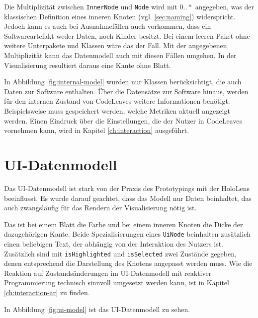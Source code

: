 Die Multiplizität zwischen \texttt{InnerNode} und \texttt{Node} wird mit $0..*$ angegeben, was der klassischen Definition eines inneren Knoten (vgl. \ref{sec:naming}) widerspricht. Jedoch kann es auch bei Ausnahmefällen auch vorkommen, dass ein Softwareartefakt weder Daten, noch Kinder besitzt. Bei einem leeren Paket ohne weitere Unterpakete und Klassen wäre das der Fall. Mit der angegebenen Multiplizität kann das Datenmodell auch mit diesen Fällen umgehen. In der Visualisierung resultiert daraus eine Kante ohne Blatt.

In Abbildung \ref{fig:internal-model} wurden nur Klassen berücksichtigt, die auch Daten zur Software enthalten. Über die Datensätze zur Software hinaus, werden für den internen Zustand von CodeLeaves weitere Informationen benötigt. Beispielsweise muss gespeichert werden, welche Metriken aktuell angezeigt werden. Einen Eindruck über die Einstellungen, die der Nutzer in CodeLeaves vornehmen kann, wird in Kapitel \ref{ch:interaction} ausgeführt.

\section{UI-Datenmodell}
\label{sec:hierarchical-model}

Das UI-Datenmodell ist stark von der Praxis des Prototypings mit der HoloLens beeinflusst. Es wurde darauf geachtet, dass das Modell nur Daten beinhaltet, das auch zwangsläufig für das Rendern der Visualisierung nötig ist.

Das ist bei einem Blatt die Farbe und bei einem inneren Knoten die Dicke der dazugehörigen Kante. Beide Spezialisierungen eines \texttt{UiNode} beinhalten zusätzlich einen beliebigen Text, der abhängig von der Interaktion des Nutzers ist. Zusätzlich sind mit \texttt{isHighlighted} und \texttt{isSelected} zwei Zustände gegeben, denen entsprechend die Darstellung des Knotens angepasst werden muss. Wie die Reaktion auf Zustandsänderungen im UI-Datenmodell mit reaktiver Programmierung technisch sinnvoll umgesetzt werden kann, ist in Kapitel \ref{ch:interaction-ar} zu finden.

In Abbildung \ref{fig:ui-model} ist das UI-Datenmodell zu sehen.


